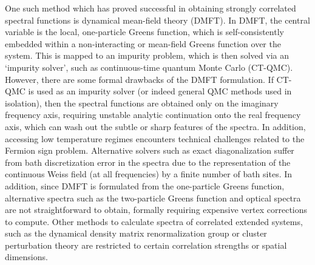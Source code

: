 \documentclass[aps,showpacs,twocolumn,nobibnotes]{revtex4}
\begin{document}
One such method which has proved successful in obtaining strongly correlated spectral functions is dynamical mean-field theory (DMFT)\cite{Georges1992,Georges1996,Kotliar2006}. In 
DMFT, the central variable is the local, one-particle Greens function, which is self-consistently embedded within a non-interacting or 
mean-field Greens function over the system. This is mapped to an impurity problem, which is then solved via an `impurity solver', such as 
continuous-time quantum Monte Carlo (CT-QMC)\cite{Millis2006}. However, there are some formal drawbacks of the DMFT formulation. If CT-QMC is used as an 
impurity solver (or indeed general QMC methods used in isolation), then the spectral functions are obtained only on the imaginary frequency 
axis, requiring unstable analytic continuation onto the real frequency axis, which can wash out the subtle or sharp features of the 
spectra\cite{Thomas2011}. In addition, accessing low temperature regimes encounters technical challenges related to the Fermion sign problem.
Alternative solvers such as exact diagonalization suffer from bath discretization error in the spectra due to the 
representation of the continuous Weiss field (at all frequencies) by a finite number of bath sites. In addition, since DMFT
is formulated from the one-particle Greens function, alternative spectra such as the two-particle Greens function and optical spectra are 
not straightforward to obtain, formally requiring expensive vertex corrections to compute\cite{Millis2012}. Other methods to calculate 
spectra of correlated extended systems, such as the dynamical density matrix renormalization group\cite{Jeckelmann2004} or cluster perturbation 
theory\cite{Senechal2000} are restricted to certain correlation strengths or spatial dimensions.
\end{document}
